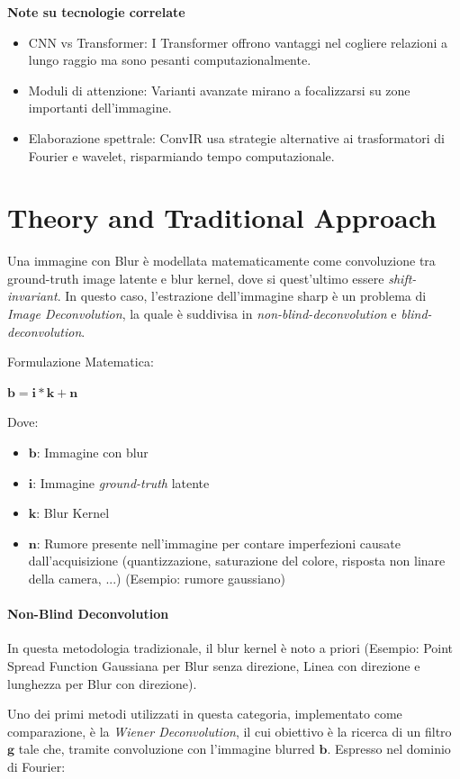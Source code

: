 \documentclass[a4paper,10pt,twocolumn]{article}
\begin{document}
\textbf{Note su tecnologie correlate}
\begin{itemize}[topsep=0pt, noitemsep]
  \item CNN vs Transformer: I Transformer offrono vantaggi nel cogliere relazioni a lungo raggio ma sono pesanti computazionalmente.
  \item Moduli di attenzione: Varianti avanzate mirano a focalizzarsi su zone importanti dell'immagine.
  \item Elaborazione spettrale: ConvIR usa strategie alternative ai trasformatori di Fourier e wavelet, risparmiando tempo computazionale.
\end{itemize}

\section{Theory and Traditional Approach}

Una immagine con Blur \`e modellata matematicamente come convoluzione tra ground-truth image latente e blur kernel, dove si quest'ultimo essere \textit{\gls{shift-invariant}}. In questo caso,
l'estrazione dell'immagine sharp \`e un problema di \textit{Image Deconvolution}, la quale \`e suddivisa in \textit{\Gls{non-blind-deconvolution}} e \textit{\Gls{blind-deconvolution}}.\par
Formulazione Matematica:

\begin{math}
  \bm{b} = \bm{i} * \bm{k} + \bm{n}
\end{math}

Dove:

\begin{itemize}[topsep=0pt, noitemsep]
  \item[] $\bm{b}$: Immagine con blur
  \item[] $\bm{i}$: Immagine \textit{ground-truth} latente
  \item[] $\bm{k}$: Blur Kernel
  \item[] $\bm{n}$: Rumore presente nell'immagine per contare imperfezioni causate dall'acquisizione (quantizzazione, saturazione del colore, risposta non linare della camera, ...) (Esempio: rumore gaussiano)
\end{itemize}

\paragraph*{Non-Blind Deconvolution}

In questa metodologia tradizionale, il blur kernel \`e noto a priori (Esempio: Point Spread Function Gaussiana per Blur senza direzione, Linea con direzione e lunghezza per Blur con direzione).\par
Uno dei primi metodi utilizzati in questa categoria, implementato come comparazione, \`e la \textit{Wiener Deconvolution}, il cui obiettivo \`e la ricerca di un filtro $\bm{g}$ tale che, tramite
convoluzione con l'immagine blurred $\bm{b}$. Espresso nel dominio di Fourier:
\end{document}
